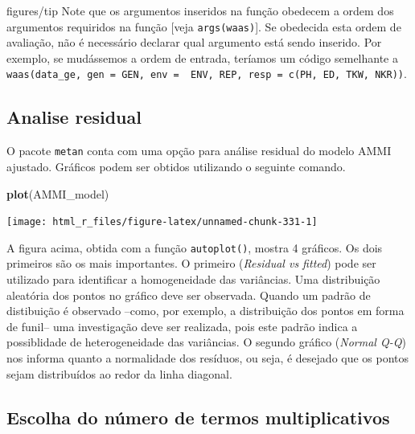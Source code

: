 \documentclass[
]{book}
\newenvironment{Shaded}{\begin{snugshade}}{\end{snugshade}}
\newcommand{\KeywordTok}[1]{\textcolor[rgb]{0.13,0.29,0.53}{\textbf{#1}}}
\newcommand{\NormalTok}[1]{#1}
\numberwithin{equation}{section}
\newcommand{\indt}[1]{\index{#1|ST}}
\newenvironment{dica}
  {\begin{customBlockImage}[colframe=customBlue, title=Dica]{figures/tip}}
  {\end{customBlockImage}}
\begin{document}
\indt{Dicas}
\begin{dica}
Note que os argumentos inseridos na função obedecem a ordem dos argumentos requiridos na função {[}veja \texttt{args(waas)}{]}. Se obedecida esta ordem de avaliação, não é necessário declarar qual argumento está sendo inserido. Por exemplo, se mudássemos a ordem de entrada, teríamos um código semelhante a \texttt{waas(data\_ge,\ gen\ =\ GEN,\ env\ =\ \ ENV,\ REP,\ resp\ =\ c(PH,\ ED,\ TKW,\ NKR))}.
\end{dica}

\hypertarget{analise-residual}{%
\subsection{Analise residual}\label{analise-residual}}

O pacote \texttt{metan} conta com uma opção para análise residual do modelo AMMI ajustado. Gráficos podem ser obtidos utilizando o seguinte comando.

\begin{Shaded}
\begin{Highlighting}[]
\KeywordTok{plot}\NormalTok{(AMMI\_model)}
\end{Highlighting}
\end{Shaded}

\begin{center}\texttt{[image: html\_r\_files/figure-latex/unnamed-chunk-331-1]} \end{center}

A figura acima, obtida com a função \texttt{autoplot()}, mostra 4 gráficos. Os dois primeiros são os mais importantes. O primeiro (\emph{Residual vs fitted}) pode ser utilizado para identificar a homogeneidade das variâncias. Uma distribuição aleatória dos pontos no gráfico deve ser observada. Quando um padrão de distibuição é observado --como, por exemplo, a distribuição dos pontos em forma de funil-- uma investigação deve ser realizada, pois este padrão indica a possiblidade de heterogeneidade das variâncias. O segundo gráfico (\emph{Normal Q-Q}) nos informa quanto a normalidade dos resíduos, ou seja, é desejado que os pontos sejam distribuídos ao redor da linha diagonal.

\hypertarget{escolha-do-nuxfamero-de-termos-multiplicativos}{%
\subsection{Escolha do número de termos multiplicativos}\label{escolha-do-nuxfamero-de-termos-multiplicativos}}
\end{document}
